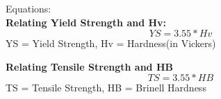 \documentclass{article}
\begin{document}
Equations:\\

\textbf{Relating Yield Strength and Hv:}
\begin{equation}
YS = 3.55 * Hv
\end{equation}
YS = Yield Strength, Hv = Hardness(in Vickers)

\textbf{Relating Tensile Strength and HB}
\begin{equation}
TS = 3.55 * HB
\end{equation}
TS = Tensile Strength, HB = Brinell Hardness
\end{document}
